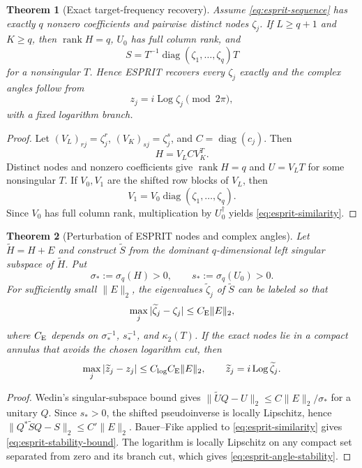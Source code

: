 \documentclass[11pt]{article}
\newtheorem{theorem}{Theorem}[section]
\newcommand{\ii}{i}
\DeclareMathOperator{\rank}{rank}
\DeclareMathOperator{\diag}{diag}
\numberwithin{equation}{section}
\begin{document}
\begin{theorem}[Exact target-frequency recovery]\label{thm:esprit-exact}
Assume \eqref{eq:esprit-sequence} has exactly $q$ nonzero coefficients and pairwise distinct nodes $\zeta_j$.  If $L\ge q+1$ and $K\ge q$, then $\rank H=q$, $U_0$ has full column rank, and
\begin{equation}\label{eq:esprit-similarity}
 S=T^{-1}\diag(\zeta_1,\ldots,\zeta_q)T
\end{equation}
for a nonsingular $T$.  Hence ESPRIT recovers every $\zeta_j$ exactly and the complex angles follow from
\begin{equation}\label{eq:esprit-angle-recovery}
 z_j=\ii\operatorname{Log}\zeta_j\pmod{2\pi},
\end{equation}
with a fixed logarithm branch.
\end{theorem}
\begin{proof}
Let $(V_L)_{rj}=\zeta_j^r$, $(V_K)_{sj}=\zeta_j^s$, and $C=\diag(c_j)$.  Then
\begin{equation}\label{eq:esprit-factorization}
 H=V_LCV_K^T.
\end{equation}
Distinct nodes and nonzero coefficients give $\rank H=q$ and $U=V_LT$ for some nonsingular $T$.  If $V_0,V_1$ are the shifted row blocks of $V_L$, then
\begin{equation}\label{eq:vandermonde-shift}
 V_1=V_0\diag(\zeta_1,\ldots,\zeta_q).
\end{equation}
Since $V_0$ has full column rank, multiplication by $U_0^\dagger$ yields \eqref{eq:esprit-similarity}.
\end{proof}

\begin{theorem}[Perturbation of ESPRIT nodes and complex angles]\label{thm:esprit-stability}
Let $\widetilde H=H+E$ and construct $\widetilde S$ from the dominant $q$-dimensional left singular subspace of $\widetilde H$.  Put
\[
 \sigma_*:=\sigma_q(H)>0,
 \qquad s_*:=\sigma_q(U_0)>0.
\]
For sufficiently small $\|E\|_2$, the eigenvalues $\widetilde\zeta_j$ of $\widetilde S$ can be labeled so that
\begin{equation}\label{eq:esprit-stability-bound}
 \max_j|\widetilde\zeta_j-\zeta_j|\le C_{\rm E}\|E\|_2,
\end{equation}
where $C_{\rm E}$ depends on $\sigma_*^{-1}$, $s_*^{-1}$, and $\kappa_2(T)$.  If the exact nodes lie in a compact annulus that avoids the chosen logarithm cut, then
\begin{equation}\label{eq:esprit-angle-stability}
 \max_j|\widetilde z_j-z_j|
 \le C_{\log}C_{\rm E}\|E\|_2,
 \qquad \widetilde z_j=\ii\operatorname{Log}\widetilde\zeta_j.
\end{equation}
\end{theorem}
\begin{proof}
Wedin's singular-subspace bound gives $\|\widetilde UQ-U\|_2\le C\|E\|_2/\sigma_*$ for a unitary $Q$.  Since $s_*>0$, the shifted pseudoinverse is locally Lipschitz, hence $\|Q^*\widetilde SQ-S\|_2\le C'\|E\|_2$.  Bauer--Fike applied to \eqref{eq:esprit-similarity} gives \eqref{eq:esprit-stability-bound}.  The logarithm is locally Lipschitz on any compact set separated from zero and its branch cut, which gives \eqref{eq:esprit-angle-stability}.
\end{proof}
\end{document}
